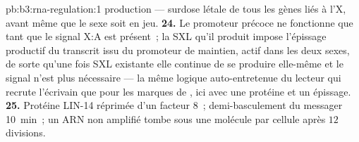 \begin{solution}{pb:b3:rna-regulation:1}
production --- surdose létale de tous les gènes liés à l'X, avant même
que le sexe soit en jeu.
\textbf{24.} Le promoteur précoce ne fonctionne que tant que le signal
X:A est présent~; la SXL qu'il produit impose l'épissage productif du
transcrit issu du promoteur de maintien, actif dans les deux sexes, de
sorte qu'une fois SXL existante elle continue de se produire elle-même
et le signal n'est plus nécessaire --- la même logique auto-entretenue
du lecteur qui recrute l'écrivain que pour les marques de ,
ici avec une protéine et un épissage.
\textbf{25.} Protéine LIN-14 réprimée d'un facteur $8$~; demi-basculement
du messager \qty{10}{min}~; un ARN non amplifié tombe sous une molécule
par cellule après $12$ divisions.
\end{solution}
